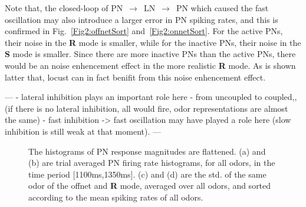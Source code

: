 \documentclass[12pt, a4paper]{article}
\begin{document}
Note that, the closed-loop of {PN~$\rightarrow$~LN~$\rightarrow$~PN} which caused the fast oscillation may also introduce a larger error in PN spiking rates, and this is confirmed in Fig.~\ref{Fig2:offnetSort} and~\ref{Fig2:onnetSort}. For the active PNs, their noise in the {\bf R} mode is smaller, while for the inactive PNs, their noise in the {\bf S} mode is smaller. Since there are more inactive PNs than the active PNs, there would be an noise enhencement effect in the more realistic {\bf R} mode. As is shown latter that, locust can in fact benifit from this noise enhencement effect.

---
- lateral inhibition plays an important role here
- from uncoupled to coupled,, (if there is no lateral inhibition, all would fire, odor representations are almost the same)
- fast inhibition -> fast oscillation may have played a role here (slow inhibition is still weak at that moment).
---

\begin{figure}[htbp]\centering
    \hspace{0.5cm}

    \hspace{0.5cm}
\caption[Hist~Flatten]{\label{Figure2:histflatten} \small The histograms of PN response magnitudes are flattened. (a) and (b) are trial averaged PN firing rate histograms, for all odors, in the time period [1100ms,1350ms]. (c) and (d) are the std. of the same odor of the offnet and {\bf R} mode, averaged over all odors, and sorted according to the mean spiking rates of all odors.}
\end{figure}
\end{document}
